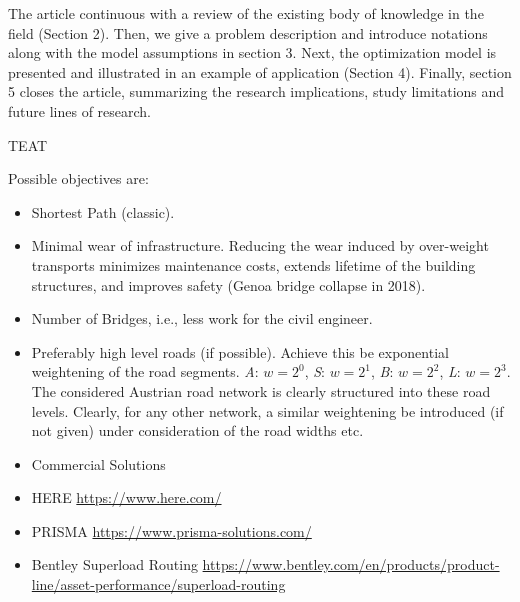 \par The article continuous with a review of the existing body of knowledge in the field (Section 2). Then, we give a problem description and introduce notations along with the model assumptions in section 3. Next, the optimization model is presented and illustrated in an example of application (Section 4). Finally, section 5 closes the article, summarizing the research implications, study limitations and future lines of research.

TEAT


Possible objectives are:
\begin{itemize}
  \item Shortest Path (classic).

  \item Minimal wear of infrastructure. Reducing the wear induced by over-weight transports
  minimizes maintenance costs, extends lifetime of the building structures, and
  improves safety (Genoa bridge collapse in 2018).
  \citet{Kakan2014}


  \item Number of Bridges, i.e., less work for the civil engineer.
  \item Preferably high level roads (if possible).
  Achieve this be exponential weightening of the road segments.
  \textit{A}: $w=2^0$,    \textit{S}: $w=2^1$,      \textit{B}: $w=2^2$,     \textit{L}: $w=2^3$.
  The considered Austrian road network is clearly structured into these road levels.
  Clearly, for any other network, a similar weightening be introduced
  (if not given) under consideration of the road widths etc.
\end{itemize}

\begin{itemize}





\item Commercial Solutions

\item HERE
\url{https://www.here.com/}
\item PRISMA
\url{https://www.prisma-solutions.com/}

\item Bentley Superload Routing
\url{https://www.bentley.com/en/products/product-line/asset-performance/superload-routing}

\end{itemize}
